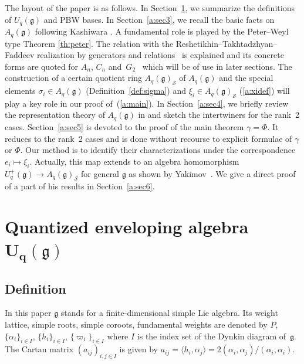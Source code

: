 \documentclass[pdftex]{sigma}
\newcommand{\geh}{\mathfrak{g}}
\newcommand{\pair}[1]{\langle{#1}\rangle}
\begin{document}
The layout of the paper is as follows.
In Section~\ref{a:sec2},
we summarize the def\/initions of $U_q(\geh)$ and PBW bases.
In Section~\ref{a:sec3},
we recall  the basic facts on $A_q(\geh)$ following Kashiwara \cite{Kas93}.
A fundamental role is played by the Peter--Weyl type Theorem \ref{th:peter}.
The relation with  the Reshetikhin--Takhtadzhyan--Faddeev realization
by generators and relations~\cite{RTF} is explained and
its concrete forms are quoted for
$A_n$, $C_n$ and~$G_2$~\cite{Sasaki} which will be of use in later sections.
The construction of a certain quotient ring
$A_q(\geh)_{\mathcal S}$ of $A_q(\geh)$ and
the special elements $\sigma_i \in  A_q(\geh)$
(Def\/inition~\ref{def:sigma})
and $\xi_i \in A_q(\geh)_{\mathcal S}$ (\ref{a:xidef}) will play
a key role in
our proof of~(\ref{a:main}).
In Section~\ref{a:sec4},
we brief\/ly review the representation theory  of $A_q(\geh)$
in \cite{So1,So2,VS} and sketch the intertwiners
for the rank~2 cases.
Section~\ref{a:sec5} is devoted
to the proof of the main theorem $\gamma = \Phi$.
It reduces to the rank~2 cases and
is done without recourse to explicit formulae of $\gamma$ or $\Phi$.
Our method is to identify their characterizations
under the correspondence $e_i \mapsto \xi_i$.
Actually, this map extends to an algebra homomorphism
$U^+_q(\geh) \rightarrow A_q(\geh)_{\mathcal S}$
for general $\geh$ as shown by Yakimov~\cite{Yak}.
We give a direct proof of a part of his results in Section~\ref{a:sec6}.


\section[Quantized enveloping algebra $U_q(\geh)$]{Quantized enveloping algebra $\boldsymbol{U_q(\geh)}$}\label{a:sec2}

\subsection{Def\/inition}

In this paper $\geh$ stands for a f\/inite-dimensional simple Lie algebra.
Its weight lattice, simple roots, simple coroots, fundamental weights are
denoted by $P$, $\{\alpha_i\}_{i\in I}$, $\{h_i\}_{i\in I}$, $\{\varpi_i\}_{i\in I}$
where $I$ is the index set of the Dynkin diagram of~$\geh$.
The Cartan matrix $(a_{ij})_{i,j\in I}$ is given by
$a_{ij}=\pair{h_i,\alpha_j}=2(\alpha_i, \alpha_j)/(\alpha_i,\alpha_i)$.
\end{document}
